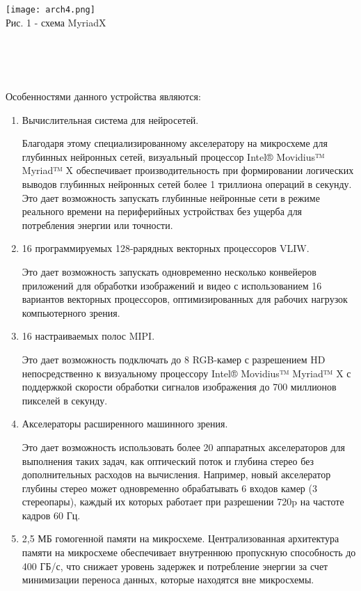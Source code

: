 \documentclass{article}
\begin{document}
    \begin{center} 
    \texttt{[image: arch4.png]}
    \\
    \caption{Рис. 1 - схема MyriadX}
    \\ \\
    \end{center} 
    \\
    Особенностями данного устройства являются:
    \begin{enumerate}
    \item Вычислительная система для нейросетей.
    
    Благодаря этому специализированному акселератору на микросхеме для глубинных нейронных сетей, визуальный процессор Intel® Movidius™ Myriad™ X обеспечивает производительность при формировании логических выводов глубинных нейронных сетей более 1 триллиона операций в секунду. Это дает возможность запускать глубинные нейронные сети в режиме реального времени на периферийных устройствах без ущерба для потребления энергии или точности.
    \item 16 программируемых 128-рарядных векторных процессоров VLIW.
    
    Это дает возможность запускать одновременно несколько конвейеров приложений для обработки изображений и видео с использованием 16 вариантов векторных процессоров, оптимизированных для рабочих нагрузок компьютерного зрения.
    \item 16 настраиваемых полос MIPI. 
    
    Это дает возможность подключать до 8 RGB-камер с разрешением HD непосредственно к визуальному процессору Intel® Movidius™ Myriad™ X с поддержкой скорости обработки сигналов изображения до 700 миллионов пикселей в секунду.
    \item Акселераторы расширенного машинного зрения.
    
    Это дает возможность использовать более 20 аппаратных акселераторов для выполнения таких задач, как оптический поток и глубина стерео без дополнительных расходов на вычисления. Например, новый акселератор глубины стерео может одновременно обрабатывать 6 входов камер (3 стереопары), каждый их которых работает при разрешении 720p на частоте кадров 60 Гц.
    \item 2,5 МБ гомогенной памяти на микросхеме. 
    Централизованная архитектура памяти на микросхеме обеспечивает внутреннюю пропускную способность до 400 ГБ/с, что снижает уровень задержек и потребление энергии за счет минимизации переноса данных, которые находятся вне микросхемы.
    \end{enumerate}
\end{document}
